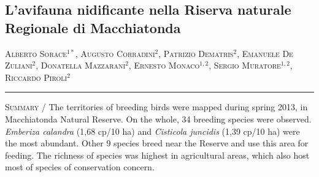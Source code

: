 \setcounter{figure}{0}
\setcounter{table}{0}

\begin{adjustwidth}{-3.5cm}{0cm}
\pagestyle{CIOpage}
\chapter*[]{\bfseries
L{\textquoteright}avifauna nidificante nella Riserva naturale Regionale di Macchiatonda}

\textsc{Alberto Sorace}$^{1*}$, \textsc{Augusto Corradini}$^2$, \textsc{Patrizio Dematris}$^2$, \textsc{Emanuele De Zuliani}$^2$, \textsc{Donatella Mazzarani}$^2$, \textsc{Ernesto Monaco}$^{1, 2}$, \textsc{Sergio Muratore}$^{1, 2}$, \textsc{Riccardo Piroli}$^2$ \\

       
\noindent\color{MUSEBLUE}\rule{27cm}{2pt}
\vspace{1cm}
\end{adjustwidth}


{\small
\noindent \textsc{\color{MUSEBLUE} Summary} / The territories of breeding birds were mapped during spring 2013, in Macchiatonda Natural Reserve. On the whole, 34
breeding species were observed. \textit{Emberiza calandra} (1,68 cp/10 ha) and \textit{Cisticola juncidis} (1,39 cp/10
ha) were the most abundant. Other 9 species breed near the Reserve and use this area for feeding. The richness of
species was highest in agricultural areas, which also host most of species of conservation concern.\\
}

